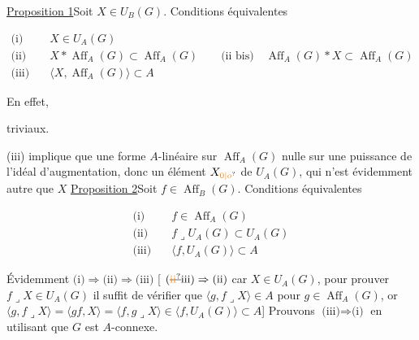 \uline{Proposition 1}\quad Soit $X\in U_B(G)$. Conditions équivalentes

\[
\begin{aligned}
\text{(i)}\quad &X\in U_A(G)\\
\text{(ii)}\quad &X*\operatorname{Aff}_A(G)\subset\operatorname{Aff}_A(G)
  \qquad\text{(ii bis)}\quad\operatorname{Aff}_A(G)*X\subset\operatorname{Aff}_A(G)\\
\text{(iii)}\quad &\langle X,\operatorname{Aff}_A(G)\rangle\subset A
\end{aligned}
\]

En effet,


triviaux.

(iii) implique que    une forme $A$-linéaire sur $\operatorname{Aff}_A(G)$ nulle sur une puissance de l'idéal d'augmentation, donc un élément $X_{\unsure{0|o}}$ de $U_A(G)$, qui n'est évidemment autre que $X$
\uline{Proposition 2}\quad Soit $f\in\operatorname{Aff}_B(G)$. Conditions équivalentes


\[
\begin{aligned}
\text{(i)}\quad &f\in\operatorname{Aff}_A(G)\\
\text{(ii)}\quad &f\mathbin{\lrcorner} U_A(G)\subset U_A(G)\\
\text{(iii)}\quad &\langle f,U_A(G)\rangle\subset A
\end{aligned}
\]

Évidemment $\text{(i)}\Rightarrow\text{(ii)}\Rightarrow\text{(iii)}$ [ $\text{(}\deleted{\unsure{\mathrm{ii}}}\mathrm{iii}\text{)}\Rightarrow\text{(ii)}$ car  $X\in U_A(G)$, pour prouver $f\mathbin{\lrcorner}X\in U_A(G)$ il suffit  de vérifier que $\langle g,f\mathbin{\lrcorner}X\rangle\in A$ pour $g\in\operatorname{Aff}_A(G)$, or $\langle g,f\mathbin{\lrcorner}X\rangle=\langle gf,X\rangle=\langle f,g\mathbin{\lrcorner}X\rangle\in\langle f,U_A(G)\rangle\subset A$] Prouvons $\text{(iii)}\Rightarrow\text{(i)}$ en utilisant que $G$ est $A$-connexe.

